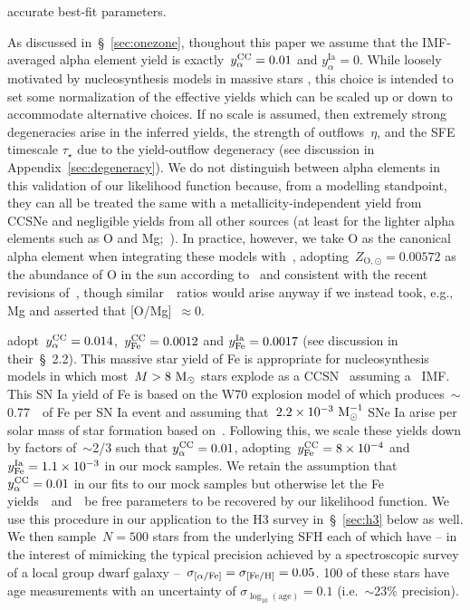 \documentclass[ms.tex]{subfiles}
\begin{document}
accurate best-fit parameters.
\par
As discussed in~\S~\ref{sec:onezone}, thoughout this paper we assume that the
IMF-averaged alpha element yield is exactly~$y_\alpha^\text{CC} = 0.01$ and
$y_\alpha^\text{Ia} = 0$.
While loosely motivated by nucleosynthesis models in massive stars
\citep[e.g.][]{Nomoto2013, Sukhbold2016, Limongi2018}, this choice is intended
to set some normalization of the effective yields which can be scaled up or
down to accommodate alternative choices.
If no scale is assumed, then extremely strong degeneracies arise in the
inferred yields, the strength of outflows~$\eta$, and the SFE timescale
$\tau_\star$ due to the yield-outflow degeneracy (see discussion in
Appendix~\ref{sec:degeneracy}).
We do not distinguish between alpha elements in this validation of our
likelihood function because, from a modelling standpoint, they can all be
treated the same with a metallicity-independent yield from CCSNe and negligible
yields from all other sources (at least for the lighter alpha elements such as
O and Mg;~\citealp{Johnson2019}).
In practice, however, we take O as the canonical alpha element when integrating
these models with~\vice, adopting~$Z_{\text{O},\odot} = 0.00572$ as the
abundance of O in the sun according to~\citet{Asplund2009} and consistent with
the recent revisions of~\citet*{Asplund2021}, though similar~\afe~ratios would
arise anyway if we instead took, e.g., Mg and asserted that [O/Mg]~$\approx 0$.
\par
\citet{Weinberg2017} adopt~$y_\alpha^\text{CC} = 0.014$,~$y_\text{Fe}^\text{CC} = 0.0012$ and
$y_\text{Fe}^\text{Ia} = 0.0017$ (see discussion in their~\S~2.2).
This massive star yield of Fe is appropriate for nucleosynthesis models in
which most~$M > 8~\text{M}_\odot$ stars explode as a CCSN~\citep[e.g.][]{Woosley1995,
Chieffi2004, Chieffi2013, Nomoto2013} assuming a~\citet{Kroupa2001} IMF.
This SN Ia yield of Fe is based on the W70 explosion model of
\citet{Iwamoto1999} which produces~$\sim$0.77~\msun~of Fe per SN Ia event and
assuming that~$2.2\times10^{-3}~\text{M}_\odot^{-1}$ SNe Ia arise per solar mass of
star formation based on~\citet{Maoz2012a}.
Following this, we scale these yields down by factors of~$\sim$2/3 such that
$y_\alpha^\text{CC} = 0.01$, adopting~$y_\text{Fe}^\text{CC} = 8\times10^{-4}$ and
$y_\text{Fe}^\text{Ia} = 1.1\times10^{-3}$ in our mock samples.
We retain the assumption that~$y_\alpha^\text{CC} = 0.01$ in our fits to our mock samples
but otherwise let the Fe yields~\yfecc~and~\yfeia~be free parameters to be
recovered by our likelihood function.
We use this procedure in our application to the H3 survey in~\S~\ref{sec:h3}
below as well.
We then sample~$N = 500$ stars from the underlying SFH each of which have -- in
the interest of mimicking the typical precision achieved by a spectroscopic
survey of a local group dwarf galaxy --~$\sigma_{\text{[$\alpha$/Fe]}} = \sigma_{\text{[Fe/H]}} = 0.05$.
100 of these stars have age measurements with an uncertainty of
$\sigma_{\log_{10}(\text{age})} = 0.1$ (i.e.~$\sim$23\% precision).
\end{document}
